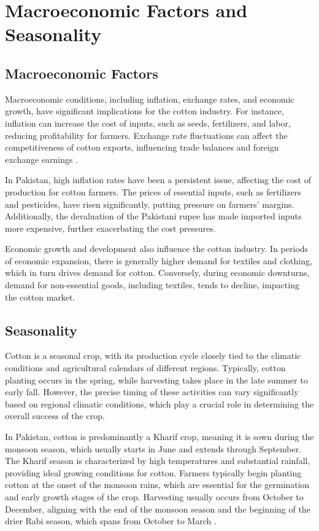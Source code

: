 \documentclass[12pt]{article}
\begin{document}
\section{Macroeconomic Factors and Seasonality}

\subsection{Macroeconomic Factors}

Macroeconomic conditions, including inflation, exchange rates, and economic growth, have significant implications for the cotton industry. For instance, inflation can increase the cost of inputs, such as seeds, fertilizers, and labor, reducing profitability for farmers. Exchange rate fluctuations can affect the competitiveness of cotton exports, influencing trade balances and foreign exchange earnings \cite{oec2023, usda2021}.

In Pakistan, high inflation rates have been a persistent issue, affecting the cost of production for cotton farmers. The prices of essential inputs, such as fertilizers and pesticides, have risen significantly, putting pressure on farmers' margins. Additionally, the devaluation of the Pakistani rupee has made imported inputs more expensive, further exacerbating the cost pressures.

Economic growth and development also influence the cotton industry. In periods of economic expansion, there is generally higher demand for textiles and clothing, which in turn drives demand for cotton. Conversely, during economic downturns, demand for non-essential goods, including textiles, tends to decline, impacting the cotton market.

\subsection{Seasonality}

Cotton is a seasonal crop, with its production cycle closely tied to the climatic conditions and agricultural calendars of different regions. Typically, cotton planting occurs in the spring, while harvesting takes place in the late summer to early fall. However, the precise timing of these activities can vary significantly based on regional climatic conditions, which play a crucial role in determining the overall success of the crop.

In Pakistan, cotton is predominantly a Kharif crop, meaning it is sown during the monsoon season, which usually starts in June and extends through September. The Kharif season is characterized by high temperatures and substantial rainfall, providing ideal growing conditions for cotton. Farmers typically begin planting cotton at the onset of the monsoon rains, which are essential for the germination and early growth stages of the crop. Harvesting usually occurs from October to December, aligning with the end of the monsoon season and the beginning of the drier Rabi season, which spans from October to March \cite{usda2023}.
\end{document}
